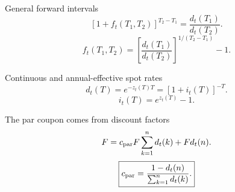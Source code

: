 \documentclass[12pt,aspectratio=169]{beamer}
\begin{document}

\begin{frame}{General forward intervals}
\[[1+f_t(T_1,T_2)]^{T_2-T_1}=\frac{d_t(T_1)}{d_t(T_2)}.\]\[f_t(T_1,T_2)=\left[\frac{d_t(T_1)}{d_t(T_2)}\right]^{1/(T_2-T_1)}-1.\]
\end{frame}


\begin{frame}{Continuous and annual-effective spot rates}
\[d_t(T)=e^{-z_t(T)T}=[1+i_t(T)]^{-T}.\]\[i_t(T)=e^{z_t(T)}-1.\]
\end{frame}


\begin{frame}{The par coupon comes from discount factors}
\[F=c_{\rm par}F\sum_{k=1}^{n}d_t(k)+Fd_t(n).\]\[\boxed{c_{\rm par}=\frac{1-d_t(n)}{\sum_{k=1}^{n}d_t(k)}.}\]
\end{frame}

\end{document}
